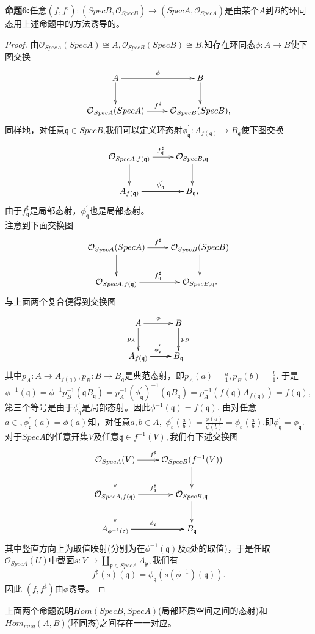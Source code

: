 \documentclass[UTF8]{article}
\begin{document}
\textbf{命题6:}任意$(f,f^{\sharp}):(SpecB,\mathcal{O}_{SpecB})\rightarrow (SpecA,\mathcal{O}_{SpecA})$是由某个$A$到$B$的环同态用上述命题中的方法诱导的。
\begin{proof}
	由$\mathcal{O}_{SpecA}(SpecA)\cong A,\mathcal{O}_{SpecB}(SpecB)\cong B$,知存在环同态$\phi:A\rightarrow B$使下图交换
$$	\xymatrix{
	A\ar[r]^{\phi}\ar[d]&B\ar[d]\\
	\mathcal{O}_{SpecA}(SpecA)\ar[r]^{f^{\sharp}}&\mathcal{O}_{SpecB}(SpecB),
}
$$	
同样地，对任意$\mathfrak{q}\in Spec B$,我们可以定义环态射$\phi_{\mathfrak{q}}^{'}:A_{f(\mathfrak{q})}\rightarrow B_{\mathfrak{q}}$使下图交换
$$\xymatrix{
	\mathcal{O}_{SpecA,f(\mathfrak{q})}\ar[r]^{f^{\sharp}_{\mathfrak{q}}}\ar[d]&\mathcal{O}_{SpecB,\mathfrak{q}}\ar[d]\\
		A_{f(\mathfrak{q})}\ar[r]^{\phi^{'}_{\mathfrak{q}}}\ar[r]&B_{\mathfrak{q}},
}	$$
由于$f^{\sharp}_{\mathfrak{q}}$是局部态射，$\phi^{'}_{\mathfrak{q}}$也是局部态射。\\
注意到下面交换图
$$
\xymatrix{
\mathcal{O}_{SpecA}(SpecA)\ar[r]^{f^{\sharp}}\ar[d]&\mathcal{O}_{SpecB}(SpecB)\ar[d]\\
	\mathcal{O}_{SpecA,f(\mathfrak{q})}\ar[r]^{f^{\sharp}_{\mathfrak{q}}}&\mathcal{O}_{SpecB,\mathfrak{q}}.
}
$$
与上面两个复合便得到交换图
$$
\xymatrix{
A\ar[r]^{\phi}\ar[d]_{p_{A}}&B\ar[d]^{p_{B}}\\
A_{f(\mathfrak{q})}\ar[r]^{\phi^{'}_{\mathfrak{q}}}\ar[r]&B_{\mathfrak{q}}
}
$$
其中$p_{A}:A\rightarrow A_{f(\mathfrak{q})},p_{B}:B\rightarrow B_{\mathfrak{q}}$是典范态射，即$p_{A}(a)=\frac{a}{1},p_{B}(b)=\frac{b}{1}.$
于是$$
\phi^{-1}(\mathfrak{q})=\phi^{-1}p_{B}^{-1}(\mathfrak{q}B_{\mathfrak{q}})=p_{A}^{-1}(\phi^{'}_{\mathfrak{q}})^{-1}(\mathfrak{q}B_{\mathfrak{q}})=p_{A}^{-1}(f(\mathfrak{q})A_{f(\mathfrak{q})})=f(\mathfrak{q}),
$$
第三个等号是由于$\phi^{'}_{\mathfrak{q}}$是局部态射。因此$\phi^{-1}(\mathfrak{q})=f(\mathfrak{q}).$
由对任意$a\in ,\phi^{'}_{\mathfrak{q}}(a)=\phi(a)$知，对任意$a,b\in A,$
$\phi^{'}_{\mathfrak{q}}(\frac{a}{b})=\frac{\phi(a)}{\phi(b)}=\phi_{\mathfrak{q}}(\frac{a}{b}).$即$\phi^{'}_{\mathfrak{q}}=\phi_{\mathfrak{q}}.$\\
对于$SpecA$的任意开集$V$及任意$\mathfrak{q}\in f^{-1}(V),$我们有下述交换图
$$
\xymatrix{
\mathcal{O}_{SpecA}(V)\ar[r]^{f^{\sharp}}\ar[d]&\mathcal{O}_{SpecB}(f^{-1}(V))\ar[d]\\
\mathcal{O}_{SpecA,f(\mathfrak{q})}\ar[r]^{f^{\sharp}_{\mathfrak{q}}}\ar[d]&\mathcal{O}_{SpecB,\mathfrak{q}}\ar[d]\\
A_{\phi^{-1}(\mathfrak{q})}\ar[r]^{\phi_{\mathfrak{q}}}\ar[r]&B_{\mathfrak{q}}
}
$$
其中竖直方向上为取值映射(分别为在$\phi^{-1}(\mathfrak{q})$及$\mathfrak{q}$处的取值)，于是任取$\mathcal{O}_{SpecA}(U)$中截面$s:V\rightarrow \coprod_{\mathfrak{p}\in SpecA}A_{\mathfrak{p}},$我们有
$$
f^{\sharp}(s)(\mathfrak{q})=\phi_{\mathfrak{q}}(s(\phi^{-1})(\mathfrak{q})).
$$因此
$(f,f^{\sharp})$由$\phi$诱导。
\end{proof}
上面两个命题说明$Hom(SpecB,SpecA)$(局部环质空间之间的态射)和$Hom_{ring}(A,B)$(环同态)之间存在一一对应。\\
\end{document}
